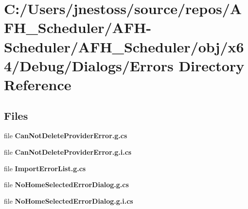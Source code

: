 \section{C\+:/\+Users/jnestoss/source/repos/\+A\+F\+H\+\_\+\+Scheduler/\+A\+F\+H-\/\+Scheduler/\+A\+F\+H\+\_\+\+Scheduler/obj/x64/\+Debug/\+Dialogs/\+Errors Directory Reference}
\label{dir_9b39c45a07641c96be1736b97d7d3275}
\subsection*{Files}
\begin{DoxyCompactItemize}
\item 
file \textbf{ Can\+Not\+Delete\+Provider\+Error.\+g.\+cs}
\item 
file \textbf{ Can\+Not\+Delete\+Provider\+Error.\+g.\+i.\+cs}
\item 
file \textbf{ Import\+Error\+List.\+g.\+cs}
\item 
file \textbf{ No\+Home\+Selected\+Error\+Dialog.\+g.\+cs}
\item 
file \textbf{ No\+Home\+Selected\+Error\+Dialog.\+g.\+i.\+cs}
\end{DoxyCompactItemize}
